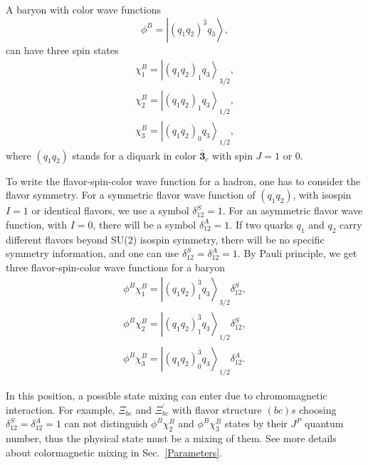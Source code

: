 \documentclass[prd,twocolumn,floatfix,nofootinbib]{revtex4}
\begin{document}
A baryon with color wave functions
\begin{equation}\label{colorB}
    \phi^{B}=\left| {\left(q_{1}q_{2}\right)}^{\bar{3}} q_{3} \right\rangle,
\end{equation}
can have three spin states
\begin{equation}\label{spinB}
    \begin{aligned}
        \chi_{1}^{B}={\left| {\left(q_{1}q_{2}\right)}_{1} q_{3} \right\rangle}_{3/2}, \\
        \chi_{2}^{B}={\left| {\left(q_{1}q_{2}\right)}_{1} q_{3} \right\rangle}_{1/2}, \\
        \chi_{3}^{B}={\left| {\left(q_{1}q_{2}\right)}_{0} q_{3} \right\rangle}_{1/2},
    \end{aligned}
\end{equation}
where $\left(q_{1}q_{2}\right)$ stands for a diquark in color $\boldsymbol{\bar{3}}_{c}$ with spin $J=1$ or $0$.

To write the flavor-spin-color wave function for a hadron, one has to consider the flavor symmetry. 
For a symmetric flavor wave function of $\left(q_{1}q_{2}\right)$, with isospin $I=1$ or identical flavors, we use a symbol $\delta_{12}^{S}=1$. 
For an asymmetric flavor wave function, with $I=0$, there will be a symbol $\delta_{12}^{A}=1$. 
If two quarks $q_{1}$ and $q_{2}$ carry different flavors beyond SU(2) isospin symmetry, there will be no specific symmetry information, and one can use $\delta_{12}^{S}=\delta_{12}^{A}=1$.
By Pauli principle, we get three flavor-spin-color wave functions for a baryon
\begin{equation}\label{colorspinB}
    \begin{aligned}
        \phi^{B}\chi_{1}^{B}={\left| {\left(q_{1}q_{2}\right)}_{1}^{\bar{3}} q_{3} \right\rangle}_{3/2} \delta_{12}^{S}, \\
        \phi^{B}\chi_{2}^{B}={\left| {\left(q_{1}q_{2}\right)}_{1}^{\bar{3}} q_{3} \right\rangle}_{1/2} \delta_{12}^{S}, \\
        \phi^{B}\chi_{3}^{B}={\left| {\left(q_{1}q_{2}\right)}_{0}^{\bar{3}} q_{3} \right\rangle}_{1/2} \delta_{12}^{A}.
    \end{aligned}
\end{equation}

In this position, a possible state mixing can enter due to chromomagnetic interaction. 
For example, $\Xi_{bc}$ and $\Xi_{bc}^{\prime}$ with flavor structure $(bc)s$ choosing $\delta_{12}^{S}=\delta_{12}^{A}=1$ can not distinguish $\phi^{B}\chi_{2}^{B}$ and $\phi^{B}\chi_{3}^{B}$ states by their $J^{P}$ quantum number, 
thus the physical state must be a mixing of them. See more details about colormagnetic mixing in Sec.~\ref{Parameters}.
\end{document}
